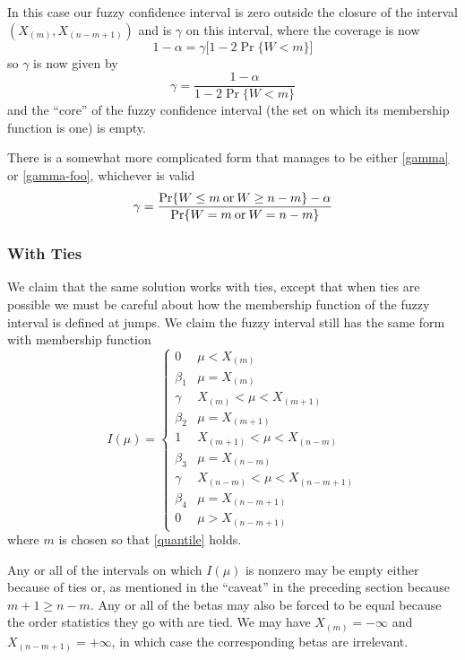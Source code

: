 \documentclass{article}
\newcommand{\opor}{\mathbin{\rm or}}
\begin{document}
In this case our fuzzy confidence interval is zero outside the closure
of the interval $(X_{(m)}, X_{(n - m + 1)})$ and is $\gamma$ on this interval,
where the coverage is now
$$
   1 - \alpha = \gamma  \bigl[ 1 - 2 \Pr \{ W < m \} \bigr]
$$
so $\gamma$ is now given by
\begin{equation} \label{gamma-foo}
   \gamma
   =
   \frac{1 - \alpha}{1 - 2 \Pr \{ W < m \}}
\end{equation}
and the ``core'' of the fuzzy confidence interval (the set on which its
membership function is one) is empty.

There is a somewhat more complicated form that manages to be
either \eqref{gamma} or \eqref{gamma-foo}, whichever is valid
\begin{equation} \label{gamma-cool}
   \gamma
   =
   \frac{\Pr \{ W \le m \opor W \ge n - m \} - \alpha}
   {\Pr \{ W = m \opor W = n - m \}}
\end{equation}

\subsubsection{With Ties}

We claim that the same solution works with ties, except that when ties
are possible
we must be careful about how the membership function of the fuzzy interval
is defined at jumps.  We claim the fuzzy interval still has the same form
with membership function
\begin{equation} \label{non-degenerate}
   I(\mu)
   =
   \begin{cases}
   0 & \mu < X_{(m)}
   \\
   \beta_1 & \mu = X_{(m)}
   \\
   \gamma & X_{(m)} < \mu < X_{(m + 1)}
   \\
   \beta_2 & \mu = X_{(m + 1)}
   \\
   1 & X_{(m + 1)} < \mu < X_{(n - m)}
   \\
   \beta_3 & \mu = X_{(n - m)}
   \\
   \gamma & X_{(n - m)} < \mu < X_{(n - m + 1)}
   \\
   \beta_4 & \mu = X_{(n - m + 1)}
   \\
   0 & \mu > X_{(n - m + 1)}
   \end{cases}
\end{equation}
where $m$ is chosen so that \eqref{quantile} holds.

Any or all of the intervals on which $I(\mu)$ is nonzero may be empty
either because of ties or, as mentioned in the ``caveat'' in the
preceding section because $m + 1 \ge n - m$.
Any or all of the betas may also be forced to be equal because the
order statistics they go with are tied.
We may have $X_{(m)} = - \infty$ and $X_{(n - m + 1)} = + \infty$,
in which case the corresponding betas are irrelevant.
\end{document}

